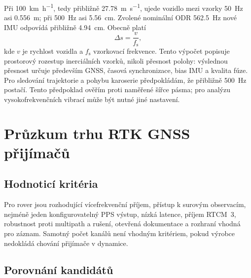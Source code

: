 Při \SI{100}{km\per\hour}, tedy přibližně \SI{27.78}{m\per\second}, ujede
vozidlo mezi vzorky \SI{50}{Hz} asi \SI{0.556}{m}; při \SI{500}{Hz} asi
\SI{5.56}{cm}. Zvolené nominální ODR \SI{562.5}{Hz} nové IMU odpovídá
přibližně \SI{4.94}{cm}. Obecně platí
\begin{equation}
  \Delta s = \frac{v}{f_\mathrm{s}},
\end{equation}
kde $v$ je rychlost vozidla a $f_\mathrm{s}$ vzorkovací frekvence. Tento
výpočet popisuje prostorový rozestup inerciálních vzorků,
nikoli přesnost polohy: výslednou přesnost určuje především GNSS, časová
synchronizace, bias IMU a kvalita fúze. Pro sledování trajektorie a pohybu karoserie předpokládám, že přibližně
\SI{500}{Hz} postačí. Tento předpoklad ověřím proti naměřené šířce pásma;
pro analýzu vysokofrekvenčních vibrací může být nutné jiné nastavení.

\section{Průzkum trhu RTK GNSS přijímačů}

\subsection{Hodnoticí kritéria}

Pro rover jsou rozhodující vícefrekvenční příjem, přístup k surovým
observacím, nejméně jeden konfigurovatelný PPS výstup, nízká latence, příjem
RTCM~3, robustnost proti multipath a rušení, otevřená dokumentace a rozhraní
vhodná pro záznam. Samotný počet kanálů není vhodným kritériem, pokud výrobce
nedokládá chování přijímače v dynamice.

\subsection{Porovnání kandidátů}


